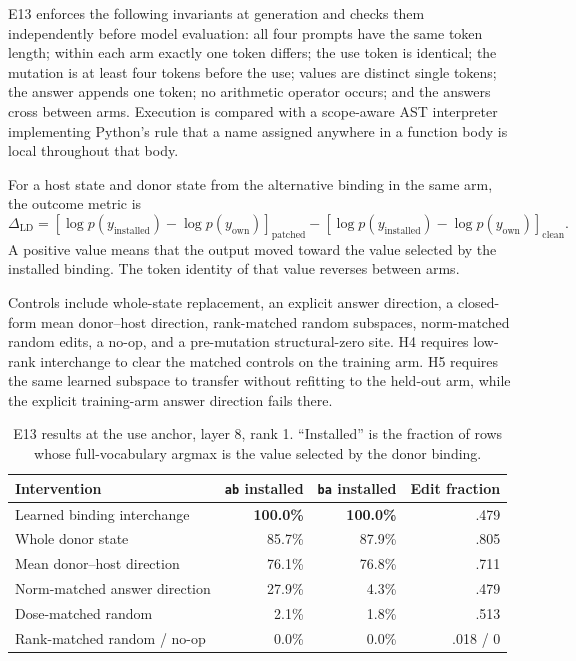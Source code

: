 \documentclass{article}
\begin{document}
E13 enforces the following invariants at generation and checks them independently before model evaluation: all four prompts have the same token length; within each arm exactly one token differs; the use token is identical; the mutation is at least four tokens before the use; values are distinct single tokens; the answer appends one token; no arithmetic operator occurs; and the answers cross between arms. Execution is compared with a scope-aware AST interpreter implementing Python's rule that a name assigned anywhere in a function body is local throughout that body.

For a host state and donor state from the alternative binding in the same arm, the outcome metric is
\begin{equation}
\Delta_{\mathrm{LD}} =
\left[\log p(y_{\mathrm{installed}})-\log p(y_{\mathrm{own}})\right]_{\mathrm{patched}}
-
\left[\log p(y_{\mathrm{installed}})-\log p(y_{\mathrm{own}})\right]_{\mathrm{clean}}.
\end{equation}
A positive value means that the output moved toward the value selected by the installed binding. The token identity of that value reverses between arms.

Controls include whole-state replacement, an explicit answer direction, a closed-form mean donor--host direction, rank-matched random subspaces, norm-matched random edits, a no-op, and a pre-mutation structural-zero site. H4 requires low-rank interchange to clear the matched controls on the training arm. H5 requires the same learned subspace to transfer without refitting to the held-out arm, while the explicit training-arm answer direction fails there.

\begin{table}[h]
\centering
\small
\caption{E13 results at the use anchor, layer 8, rank 1. ``Installed'' is the fraction of rows whose full-vocabulary argmax is the value selected by the donor binding.}
\begin{tabular}{lrrr}
\toprule
Intervention & \texttt{ab} installed & \texttt{ba} installed & Edit fraction \\
\midrule
Learned binding interchange & \textbf{100.0\%} & \textbf{100.0\%} & .479 \\
Whole donor state & 85.7\% & 87.9\% & .805 \\
Mean donor--host direction & 76.1\% & 76.8\% & .711 \\
Norm-matched answer direction & 27.9\% & 4.3\% & .479 \\
Dose-matched random & 2.1\% & 1.8\% & .513 \\
Rank-matched random / no-op & 0.0\% & 0.0\% & .018 / 0 \\
\bottomrule
\end{tabular}
\end{table}
\end{document}
